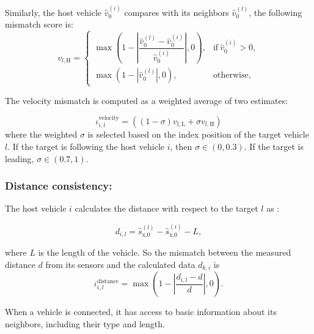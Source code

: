 Similarly, the host vehicle $\hat{v}_{0}^{(i)}$ compares with its neighbors $\hat{v}_{0}^{(l)}$, the following mismatch score is:
\begin{equation}
    v_{l,\text{H}} = 
        \begin{cases} 
            \max\left(1 - \left|\dfrac{\hat{v}_{0}^{(l)} - \hat{v}_{0}^{(i)}}{\hat{v}_{0}^{(i)}}\right|,  0\right), & \text{if} \  \hat{v}_{0}^{(i)} > 0, \\
            \max\left(1 - |\hat{v}_{0}^{(l)}|,  0\right), & \text{otherwise},
        \end{cases}
\end{equation}



The velocity mismatch is computed as a weighted average of two estimates:

\begin{equation}
    \iota_{i,l}^\text{velocity} = ((1-\sigma) v_{l,\text{L}} +\sigma  v_{l,\text{H}})    
\end{equation}
where the weighted $\sigma$ is selected based on the index position of the target vehicle $l$. If the target is following the host vehicle $i$, then $\sigma \in (0, 0.3)$. If the target is leading, $\sigma \in (0.7, 1)$.


\subsubsection{Distance consistency:}
The host vehicle $i$ calculates the distance with respect to the target $l$ as :

\begin{equation*}
    d_{i,l} = \hat{s}_{\text{x,}0}^{(l)} - \hat{s}_{\text{x,}0}^{(i)} - L,
\end{equation*} 

where $L$ is the length of the vehicle. 
So the mismatch between the measured distance $d$ from its sensors and the calculated data $d_{k,i}$ is 
\begin{equation}
    \iota_{i,l}^{\text{distance}} = \max\left(1 - \left|\frac{d_{i,l} - d}{d}\right|, 0\right).
\end{equation}
\begin{assumption}\label{assum_connect}
When a vehicle is connected, it has access to basic information about its neighbors, including their type and length.
\end{assumption}

